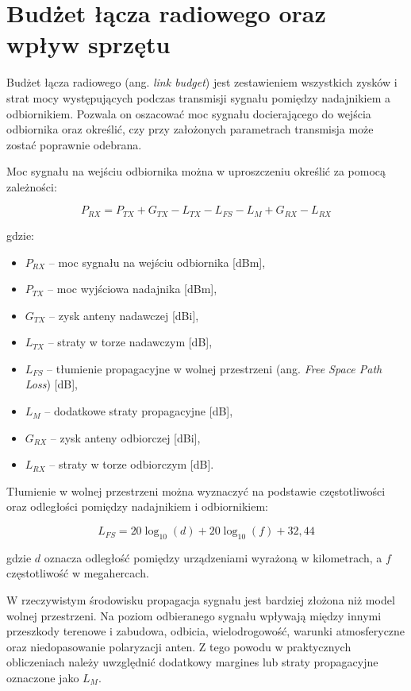 \documentclass[12pt,a4paper,twoside]{report}
\theoremstyle{definition} %
\begin{document}
\section{Budżet łącza radiowego oraz wpływ sprzętu}

Budżet łącza radiowego (ang. \textit{link budget}) jest zestawieniem wszystkich zysków i strat mocy występujących podczas transmisji sygnału pomiędzy nadajnikiem a odbiornikiem. Pozwala on oszacować moc sygnału docierającego do wejścia odbiornika oraz określić, czy przy założonych parametrach transmisja może zostać poprawnie odebrana.

Moc sygnału na wejściu odbiornika można w uproszczeniu określić za pomocą zależności:

	\begin{equation}\label{linkbudget}
        P_{RX} = P_{TX} + G_{TX} - L_{TX} - L_{FS} - L_M + G_{RX} - L_{RX}
    \end{equation}

gdzie:

\begin{itemize}
\item \(P_{RX}\) -- moc sygnału na wejściu odbiornika [dBm],
\item \(P_{TX}\) -- moc wyjściowa nadajnika [dBm],
\item \(G_{TX}\) -- zysk anteny nadawczej [dBi],
\item \(L_{TX}\) -- straty w torze nadawczym [dB],
\item \(L_{FS}\) -- tłumienie propagacyjne w wolnej przestrzeni (ang. \textit{Free Space Path Loss}) [dB],
\item \(L_M\) -- dodatkowe straty propagacyjne [dB],
\item \(G_{RX}\) -- zysk anteny odbiorczej [dBi],
\item \(L_{RX}\) -- straty w torze odbiorczym [dB].
\end{itemize}

Tłumienie w wolnej przestrzeni można wyznaczyć na podstawie częstotliwości oraz odległości pomiędzy nadajnikiem i odbiornikiem:

	\begin{equation}\label{L_FS}
        L_{FS} = 20\log_{10}(d) + 20\log_{10}(f) + 32{,}44
    \end{equation}

gdzie \(d\) oznacza odległość pomiędzy urządzeniami wyrażoną w kilometrach, a \(f\) częstotliwość w megahercach.

W rzeczywistym środowisku propagacja sygnału jest bardziej złożona niż model wolnej przestrzeni. Na poziom odbieranego sygnału wpływają między innymi przeszkody terenowe i zabudowa, odbicia, wielodrogowość, warunki atmosferyczne oraz niedopasowanie polaryzacji anten. Z tego powodu w praktycznych obliczeniach należy uwzględnić dodatkowy margines lub straty propagacyjne oznaczone jako \(L_M\).
\end{document}
